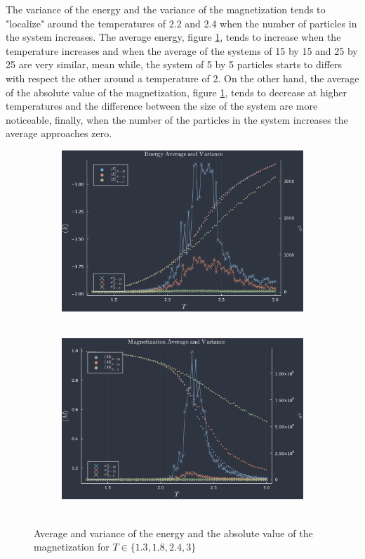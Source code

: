 \documentclass[main.tex]{subfiles}
\begin{document}
The variance of the energy and the variance of the magnetization tends to "localize" around the temperatures of 2.2 and 2.4 when the number of particles in the system increases.
The average energy, figure \ref{fig9:meanstd_a}, tends to increase when the temperature increases and when the average of the systems of 15 by 15 and 25 by 25 are very similar, mean while, the system of 5 by 5 particles starts to differs with respect the other around a temperature of 2.
On the other hand, the average of the absolute value of the magnetization, figure \ref{fig9:meanstd_a}, tends to decrease at higher temperatures and the difference between the size of the system are more noticeable, finally, when the number of the particles in the system increases the average approaches zero.

\begin{figure}
    \centering
    \begin{subfigure}[c]{0.45\textwidth}
        \includegraphics[width=\textwidth]{imgs/hw7/energyMean.pdf}
        \caption{~}\label{fig9:meanstd_a}
    \end{subfigure}
    \begin{subfigure}[c]{0.45\textwidth}
        \includegraphics[width=\textwidth]{imgs/hw7/magnetizationMean.pdf}
        \caption{~}
    \end{subfigure}\label{fig9:meanstd_b}
    \caption{Average and variance of the energy and the absolute value of the magnetization for $T\in\{1.3,1.8,2.4,3\}$}
    \label{fig9:meanstd}
\end{figure}



\end{document}
